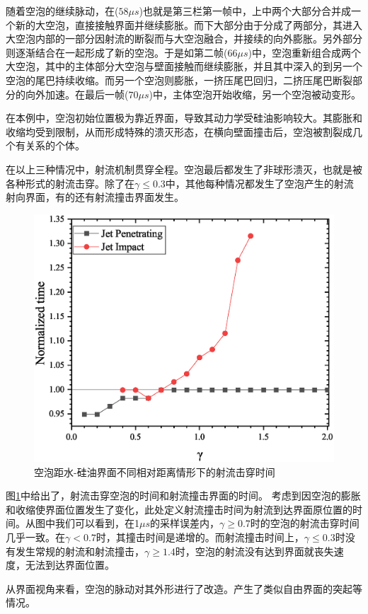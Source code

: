 随着空泡的继续脉动，在($58\mu s$)也就是第三栏第一帧中，上中两个大部分合并成一个新的大空泡，直接接触界面并继续膨胀。而下大部分由于分成了两部分，其进入大空泡内部的一部分因射流的断裂而与大空泡融合，并接续的向外膨胀。另外部分则逐渐结合在一起形成了新的空泡。于是如第二帧($66\mu s$)中，空泡重新组合成两个大空泡，其中的主体部分大空泡与壁面接触而继续膨胀，并且其中深入的到另一个空泡的尾巴持续收缩。而另一个空泡则膨胀，一挤压尾巴回归，二挤压尾巴断裂部分的向外加速。在最后一帧($70\mu s$)中，主体空泡开始收缩，另一个空泡被动变形。

在本例中，空泡初始位置极为靠近界面，导致其动力学受硅油影响较大。其膨胀和收缩均受到限制，从而形成特殊的溃灭形态，在横向壁面撞击后，空泡被割裂成几个有关系的个体。

在以上三种情况中，射流机制贯穿全程。空泡最后都发生了非球形溃灭，也就是被各种形式的射流击穿。除了在$\gamma\leq0.3$中，其他每种情况都发生了空泡产生的射流射向界面，有的还有射流撞击界面发生。



\begin{figure}[h]
    \centering
    \includegraphics[width=0.6\linewidth]{img/fig3.oiljettime.eps}
    \caption{空泡距水-硅油界面不同相对距离情形下的射流击穿时间}
    \label{fig3.oiljettime}
\end{figure}
图\ref{fig3.oiljettime}中给出了，射流击穿空泡的时间和射流撞击界面的时间。
考虑到因空泡的膨胀和收缩使界面位置发生了变化，此处定义射流撞击时间为射流到达界面原位置的时间。从图中我们可以看到，在1$\mu s$的采样误差内，$\gamma\geq0.7$时的空泡的射流击穿时间几乎一致。在$\gamma<0.7$时，其撞击时间是递增的。而射流撞击时间上，$\gamma\leq0.3$时没有发生常规的射流和射流撞击，$\gamma\geq1.4$时，空泡的射流没有达到界面就丧失速度，无法到达界面位置。

从界面视角来看，空泡的脉动对其外形进行了改造。产生了类似自由界面的突起等情况。

